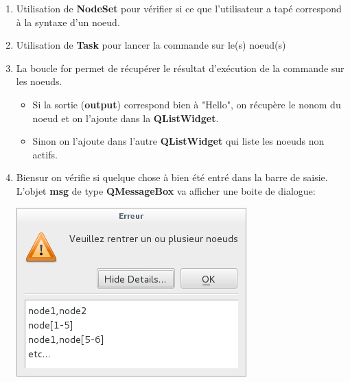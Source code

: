 \documentclass[a4paper,11pt]{article}
\begin{document}
\begin{enumerate}
\item Utilisation de \textbf{NodeSet} pour vérifier si ce que l'utilisateur a tapé correspond à la syntaxe d'un noeud.
\item Utilisation de \textbf{Task} pour lancer la commande sur le(s) noeud(s)
\item La boucle for permet de récupérer le résultat d'exécution de la commande sur les noeuds.
\begin{itemize}
\item Si la sortie (\textbf{output}) correspond bien à "Hello", on récupère le nonom du noeud et on l'ajoute dans la \textbf{QListWidget}.
\item Sinon on l'ajoute dans l'autre \textbf{QListWidget} qui liste les noeuds non actifs.
\end{itemize}
\item Biensur on vérifie si quelque chose à bien été entré dans la barre de saisie. L'objet \textbf{msg} de type \textbf{QMessageBox} va afficher une boite de dialogue:\\
\linebreak
\begin{center}
\includegraphics[scale=0.8]{messagebox.png} 
\end{center}

\end{enumerate}
 
\end{document}
